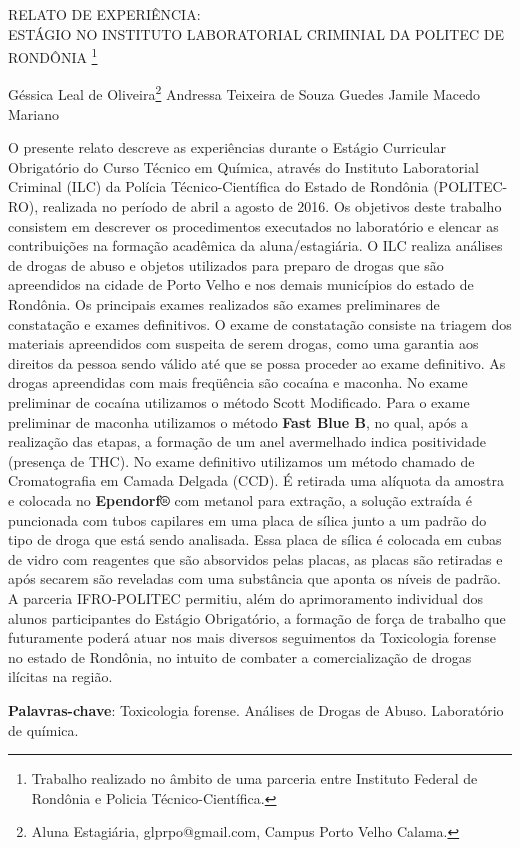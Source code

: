 \documentclass[article,12pt,onesidea,4paper,english,brazil]{abntex2}
\begin{document}
	
	
	\frenchspacing 
	
	\begin{center}
		\LARGE RELATO DE EXPERIÊNCIA:\\ESTÁGIO NO INSTITUTO LABORATORIAL CRIMINIAL DA POLITEC DE RONDÔNIA \footnote{Trabalho realizado no âmbito de uma parceria entre Instituto Federal de Rondônia e Policia Técnico-Científica.}
		
		\normalsize
		Géssica Leal de Oliveira\footnote{Aluna Estagiária, glprpo@gmail.com, Campus Porto Velho Calama.} 
		Andressa Teixeira de Souza Guedes 
		Jamile Macedo Mariano 
		
	\end{center}
	
	\noindent O presente relato descreve as experiências durante o Estágio Curricular Obrigatório do Curso Técnico em Química, através do Instituto Laboratorial Criminal (ILC) da Polícia Técnico-Científica do Estado de Rondônia (POLITEC-RO), realizada no período de abril a agosto de 2016. Os objetivos deste trabalho consistem em descrever os procedimentos executados no laboratório e elencar as contribuições na formação acadêmica da aluna/estagiária. O ILC realiza análises de drogas de abuso e objetos utilizados para preparo de drogas que são apreendidos na cidade de Porto Velho e nos demais municípios do estado de Rondônia. Os principais exames realizados são exames preliminares de constatação e exames definitivos. O exame de constatação consiste na triagem dos materiais apreendidos com suspeita de serem drogas, como uma garantia aos direitos da pessoa sendo válido até que se possa proceder ao exame definitivo. As drogas apreendidas com mais freqüência são cocaína e maconha. No exame preliminar de cocaína utilizamos o método Scott Modificado. Para o exame preliminar de maconha utilizamos o método\textbf{ Fast Blue B}, no qual, após a realização das etapas, a formação de um anel avermelhado indica positividade (presença de THC). No exame definitivo utilizamos um método chamado de Cromatografia em Camada Delgada (CCD). É retirada uma alíquota da amostra e colocada no \textbf{Ependorf®} com metanol para extração, a solução extraída é puncionada com tubos capilares em uma placa de sílica junto a um padrão do tipo de droga que está sendo analisada. Essa placa de sílica é colocada em cubas de vidro com reagentes que são absorvidos pelas placas, as placas são retiradas e após secarem são reveladas com uma substância que aponta os níveis de padrão. A parceria IFRO-POLITEC permitiu, além do aprimoramento individual dos alunos participantes do Estágio Obrigatório, a formação de força de trabalho que futuramente poderá atuar nos mais diversos seguimentos da Toxicologia forense no estado de Rondônia, no intuito de combater a comercialização de drogas ilícitas na região.
	
	\vspace{\onelineskip}
	
	\noindent
	\textbf{Palavras-chave}: Toxicologia forense. Análises de Drogas de Abuso. Laboratório de química.
	
\end{document}
